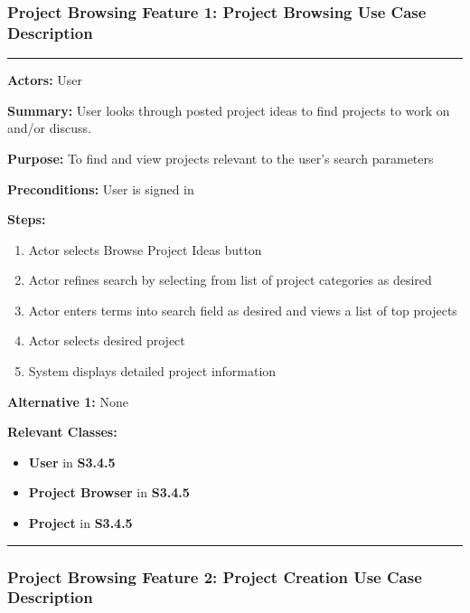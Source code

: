 \documentclass[twoside,letterpaper]{article}
\begin{document}
	
	\subsubsection[Project Browsing Feature 1: Project Browsing Use Case Description]{\rmfamily\bfseries\color{black}
	Project Browsing Feature 1: Project Browsing Use Case Description}
	\hypertarget{RefHeading22059017292}{}
	\label{pb:uc1}
	
	\vspace{2pt}
	\hrule
	\vspace{8pt}
	\textbf{Actors:} User \newline
	
	\noindent\textbf{Summary:} User looks through posted project ideas to find projects to work on and/or discuss. \newline
	
	\noindent\textbf{Purpose:} To find and view projects relevant to the user's search parameters \newline
	
	\noindent\textbf{Preconditions:} User is signed in \newline
	
	\noindent\textbf{Steps:} \begin{enumerate}
		\item Actor selects Browse Project Ideas button
		\item Actor refines search by selecting from list of project categories as desired
		\item Actor enters terms into search field as desired and views a list of top projects
		\item Actor selects desired project
		\item System displays detailed project information
	\end{enumerate}
	\noindent\textbf{Alternative 1:} None \newline
	
	
	\noindent\textbf{Relevant Classes:}
	\begin{itemize}
		\item \textbf{User} in \textbf{S3.4.5}
		\item \textbf{Project Browser} in \textbf{S3.4.5}
		\item \textbf{Project} in \textbf{S3.4.5}
	\end{itemize}
	\vspace{8pt}
	\hrule
	\newpage
	
	
	\subsubsection[Project Browsing Feature 2: Project Creation Use Case Description]{\rmfamily\bfseries\color{black}
	Project Browsing Feature 2: Project Creation Use Case Description}
	\hypertarget{RefHeading22059017292}{}
	
\end{document}
